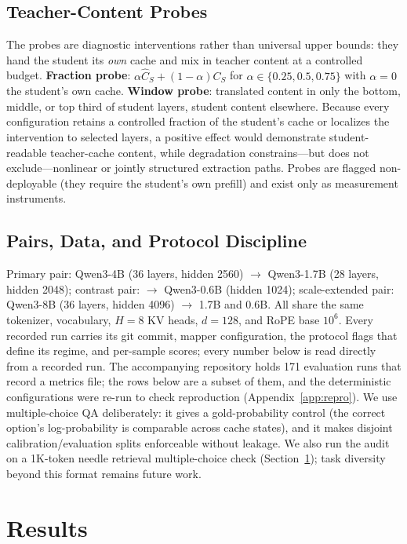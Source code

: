 \documentclass[10pt]{article}
\begin{document}
\subsection{Teacher-Content Probes}
The probes are diagnostic interventions rather than universal upper bounds:
they hand the student its \emph{own} cache and mix in teacher content at a
controlled budget.
\textbf{Fraction probe}: $\alpha\widehat{C}_S + (1-\alpha)C_S$ for
$\alpha \in \{0.25, 0.5, 0.75\}$ with $\alpha{=}0$ the student's own cache.
\textbf{Window probe}: translated content in only the bottom, middle, or top
third of student layers, student content elsewhere. Because every
configuration retains a controlled fraction of the student's cache or
localizes the intervention to selected layers, a positive
effect would demonstrate student-readable teacher-cache content, while
degradation constrains---but does not exclude---nonlinear or jointly
structured extraction paths. Probes are
flagged non-deployable (they require the student's own prefill) and exist
only as measurement instruments.

\subsection{Pairs, Data, and Protocol Discipline}
Primary pair: Qwen3-4B (36 layers, hidden 2560) $\to$ Qwen3-1.7B (28 layers,
hidden 2048); contrast pair: $\to$ Qwen3-0.6B (hidden 1024); scale-extended
pair: Qwen3-8B (36 layers, hidden 4096) $\to$ 1.7B and 0.6B. All share the
same tokenizer, vocabulary, $H{=}8$ KV heads, $d{=}128$, and RoPE base
$10^6$. Every recorded run carries its git commit, mapper configuration, the
protocol flags that define its regime, and per-sample scores; every number
below is read directly from a recorded run. The accompanying repository holds
171 evaluation runs that record a metrics file; the rows below are a subset of
them, and the deterministic configurations were re-run to check reproduction
(Appendix~\ref{app:repro}).
We use multiple-choice QA deliberately: it gives a gold-probability control
(the correct option's log-probability is comparable across cache states),
and it makes disjoint calibration/evaluation splits enforceable without
leakage. We also run the audit on a 1K-token needle retrieval
multiple-choice check (Section~\ref{sec:results}); task diversity beyond this
format remains future work.

\section{Results}
\label{sec:results}
\end{document}
